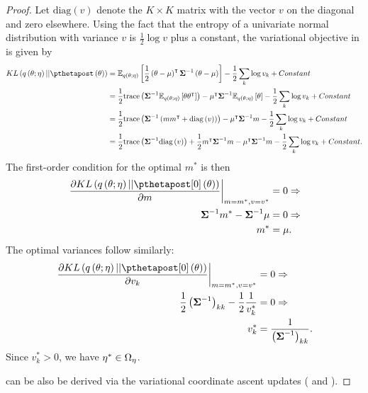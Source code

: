 \documentclass{article}\usepackage[]{graphicx}\usepackage[]{color}
\theoremstyle{definition}
\theoremstyle{plain}
\theoremstyle{plain}
\theoremstyle{plain}
\theoremstyle{definition}
\theoremstyle{plain}
\theoremstyle{plain}
\begin{document}
\begin{proof}
    Let $\textrm{diag}\left(v\right)$ denote the $K\times K$ matrix
with the vector $v$ on the diagonal and zero elsewhere. Using the
fact that the entropy of a univariate normal distribution with variance
$v$ is $\frac{1}{2}\log v$ plus a constant, the variational objective in
 is given by
\begin{align}
KL\left(q\left(\theta;\eta\right)||\pthetapost\left(\theta\right)\right) &
    =\mbe_{q\left(\theta;\eta\right)}\left[
        \frac{1}{2}\left(\theta-\mu\right)^{\trans}\covmat^{-1}
        \left(\theta-\mu\right)\right]-\frac{1}{2}\sum_{k}\log v_{k}+
        \constant\nonumber \\
 & =\frac{1}{2}\textrm{trace}\left(\covmat^{-1}
    \mbe_{q\left(\theta;\eta\right)}\left[
    \theta\theta^{\trans}\right]\right)-
    \mu^{\trans}\covmat^{-1}\mbe_{q\left(\theta;\eta\right)}
    \left[\theta\right]-\frac{1}{2}\sum_{k}\log v_{k}+\constant\nonumber \\
 & =\frac{1}{2}\textrm{trace}\left(\covmat^{-1}
    \left(mm^{\trans}+\textrm{diag}\left(v\right)\right)\right)-
    \mu^{\trans}\covmat^{-1}m-\frac{1}{2}\sum_{k}\log v_{k}+\constant\nonumber \\
 & =\frac{1}{2}\textrm{trace}\left(\covmat^{-1}
    \textrm{diag}\left(v\right)\right)+
    \frac{1}{2}m^{\trans}\covmat^{-1}m-
    \mu^{\trans}\covmat^{-1}m-\frac{1}{2}\sum_{k}\log v_{k}+
    \constant.\label{eq:mvn_kl_divergence}
\end{align}
The first-order condition for the optimal $m^{*}$ is then
\begin{align*}
\left.\frac{\partial KL\left(q\left(\theta;\eta\right)||
    \pzeropost\left(\theta\right)\right)}{\partial m}
    \right|_{m=m^{*},v=v^{*}} & =0\Rightarrow\\
\covmat^{-1}m^{*}-\covmat^{-1}\mu & =0\Rightarrow\\
m^{*} & =\mu.
\end{align*}
The optimal variances follow similarly:
\begin{align*}
\left.\frac{\partial KL\left(q\left(\theta;\eta\right)||
    \pzeropost\left(\theta\right)\right)}{\partial v_{k}}
    \right|_{m=m^{*},v=v^{*}} & =0\Rightarrow\\
\frac{1}{2}\left(\covmat^{-1}\right)_{kk}-\frac{1}{2}
    \frac{1}{v_{k}^{*}} & =0\Rightarrow\\
v_{k}^{*} & =\frac{1}{\left(\covmat^{-1}\right)_{kk}}.
\end{align*}
Since $v_{k}^{*}>0$, we have $\eta^{*}\in\Omega_{\eta}$.

 can be also be derived via the variational
coordinate ascent updates (\citet[Section 10.1.2]{bishop:2006:pattern}
and \citet[Appendix B]{giordano:2015:lrvb}).
\end{proof}
\end{document}
